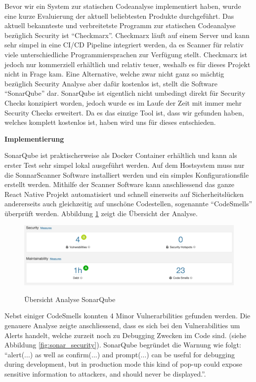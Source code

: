 Bevor wir ein System zur statischen Codeanalyse implementiert haben, wurde eine kurze Evaluierung der aktuell beliebtesten Produkte durchgeführt. Das aktuell bekannteste und verbreitetste Programm zur statischen Codeanalyse bezüglich Security ist ``Checkmarx''. Checkmarx läuft auf einem Server und kann sehr simpel in eine CI/CD Pipeline integriert werden, da es Scanner für relativ viele unterschiedliche Programmiersprachen zur Verfügung stellt. Checkmarx ist jedoch nur kommerziell erhältlich und relativ teuer, weshalb es für dieses Projekt nicht in Frage kam. Eine Alternative, welche zwar nicht ganz so mächtig bezüglich Security Analyse aber dafür kostenlos ist, stellt die Software ``SonarQube'' dar. SonarQube ist eigentlich nicht umbedingt direkt für Security Checks konzipiert worden, jedoch wurde es im Laufe der Zeit mit immer mehr Security Checks erweitert. Da es das einzige Tool ist, dass wir gefunden haben, welches komplett kostenlos ist, haben wird uns für dieses entschieden.

\textbf{Implementierung}

SonarQube ist praktischerweise als Docker Container erhältlich und kann als erster Test sehr simpel lokal ausgeführt werden. Auf dem Hostsystem muss nur die SonnarScanner Software installiert werden und ein simples Konfigurationsfile erstellt werden. Mithilfe der Scanner Software kann anschliessend das ganze React Native Projekt automatisiert und schnell einerseits auf Sicherheitslücken andererseits auch gleichzeitig auf unschöne Codestellen, sogenannte ``CodeSmells'' überprüft werden. Abbildung \ref{fig:sonar_overview} zeigt die Übersicht der Analyse. 

\begin{figure}[H]
    \centering
    \includegraphics[width=\textwidth]{images/sonar_overview.png}
    \label{fig:sonar_overview}
    \caption{Übersicht Analyse SonarQube}
\end{figure}

Nebst einiger CodeSmells konnten 4 Minor Vulnerarbilities gefunden werden. Die genauere Analyse zeigte anschliessend, dass es sich bei den Vulnerabilities um Alerts handelt, welche zurzeit noch zu Debugging Zwecken im Code sind. (siehe Abbildung \ref{fig:sonar_security}). SonarQube begründet die Warnung wie folgt: ``alert(...) as well as confirm(...) and prompt(...) can be useful for debugging during development, but in production mode this kind of pop-up could expose sensitive information to attackers, and should never be displayed.''.

